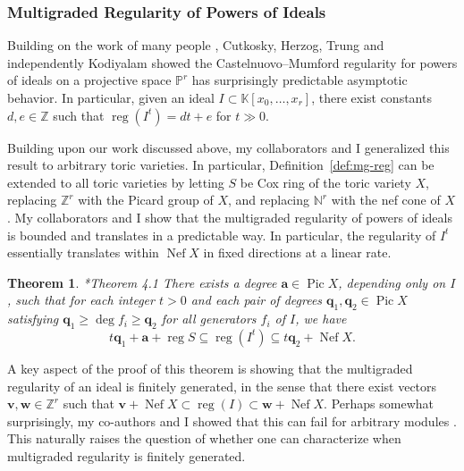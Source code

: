 \documentclass[11pt,reqno]{amsart}
\newtheorem{theorem}[lemma]{Theorem}
\theoremstyle{remark}
\newcommand{\reg}{\operatorname{reg}}
\newcommand{\Pic}{\operatorname{Pic}}
\newcommand{\Nef}{\operatorname{Nef}}
\renewcommand{\aa}{\mathbf a}
\newcommand{\vv}{\mathbf v}
\newcommand{\ww}{\mathbf w}
\newcommand{\qq}{\mathbf q}
\newcommand{\K}{\mathbb{K}}
\newcommand{\N}{\mathbb{N}}
\renewcommand{\P}{\mathbb{P}}
\newcommand{\Z}{\mathbb{Z}}
\newcommand{\juliette}[1]{{\color{red} \sf $\spadesuit\spadesuit\spadesuit$ Juliette: [#1]}}
\begin{document}
\subsubsection{Multigraded Regularity of Powers of Ideals}

Building on the work of many people \cite{bertramEinLazarsfeld91,chandler97}, Cutkosky, Herzog, Trung \cite{cutkoskyHerzogTrung99} and independently Kodiyalam \cite{kodiyalam00} showed the Castelnuovo--Mumford regularity for powers of ideals on a projective space $\P^r$ has surprisingly predictable asymptotic behavior. In particular, given an ideal $I\subset \K[x_0,\ldots,x_r]$, there exist constants $d,e\in\Z$ such that $\reg\!\left(I^t\right) = dt+e$ for $t\gg0$.

Building upon our work discussed above, my collaborators and I generalized this result to arbitrary toric varieties. In particular, Definition~\ref{def:mg-reg} can be extended to all toric varieties by letting $S$ be Cox ring of the toric variety $X$, replacing $\Z^r$ with the Picard group of $X$, and replacing $\N^{r}$ with the nef cone of $X$. My collaborators and I show that the multigraded regularity of powers of ideals is bounded and translates in a predictable way. In particular, the regularity of $I^{t}$ essentially translates within $\Nef X$ in fixed directions at a linear rate.


 

\begin{theorem}\cite{bruceHellerSayrafi22}*{Theorem 4.1}
  There exists a degree $\aa\in\Pic X$, depending only on $I$, such that for each integer $t>0$ and each pair of degrees $\qq_1,\qq_2\in\Pic X$ satisfying $\qq_1\geq\deg f_i\geq\qq_2$ for all generators $f_i$ of $I$, we have
	\[ t\qq_1+\aa+\reg S \subseteq \reg\!\left(I^t\right) \subseteq t\qq_2+\Nef X. \]
\end{theorem}

A key aspect of the proof of this theorem is showing that the multigraded regularity of an ideal is finitely generated, in the sense that there exist vectors $\vv,\ww\in \Z^r$ such that $\vv+\Nef X \subset \reg(I) \subset \ww + \Nef X$. Perhaps somewhat surprisingly, my co-authors and I showed that this can fail for arbitrary modules \cite{bruceHellerSayrafi22}. This naturally raises the question of whether one can characterize when multigraded regularity is finitely generated. 
\end{document}
